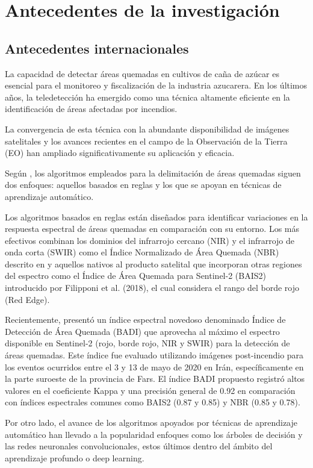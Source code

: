 \section{Antecedentes de la investigación}
\subsection{Antecedentes internacionales}
La capacidad de detectar áreas quemadas en cultivos de caña de azúcar es esencial para el monitoreo y 
fiscalización de la industria azucarera. En los últimos años, la teledetección ha emergido como una técnica altamente eficiente en la identificación 
de áreas afectadas por incendios. 

La convergencia de esta técnica con la abundante disponibilidad de imágenes 
satelitales y los avances recientes en el campo de la Observación 
de la Tierra (EO) han ampliado significativamente su aplicación y eficacia. 

Según \citet{knopp_deep_2020}, los algoritmos empleados para la delimitación de áreas quemadas siguen dos enfoques: 
aquellos basados en reglas y los que se apoyan en técnicas de aprendizaje automático.

Los algoritmos basados en reglas están diseñados para identificar variaciones en la respuesta espectral de áreas quemadas en comparación 
con su entorno. Los más efectivos combinan los dominios del infrarrojo cercano (NIR) y el infrarrojo de onda corta (SWIR) como el 
Índice Normalizado de Área Quemada (NBR) descrito en \citet{roy_remote_2006} y aquellos nativos al producto satelital que incorporan 
otras regiones del espectro como el Índice de Área Quemada para Sentinel-2 (BAIS2) introducido por Filipponi et al. (2018), el cual considera 
el rango del borde rojo (Red Edge).

Recientemente, \citet{farhadi_badi_2023} presentó un índice espectral novedoso denominado Índice de Detección de Área Quemada (BADI) que
aprovecha al máximo el espectro disponible en Sentinel-2 (rojo, borde rojo, NIR y SWIR) para la detección de áreas quemadas. Este índice fue evaluado
utilizando imágenes post-incendio para los eventos ocurridos entre el 3 y 13 de mayo de 2020 en Irán, específicamente en la parte suroeste de la provincia de Fars. El índice BADI 
propuesto registró altos valores en el coeficiente Kappa y una precisión 
general de 0.92 en comparación con índices espectrales comunes como BAIS2 (0.87 y 0.85) y NBR (0.85 y 0.78).

Por otro lado, el avance de los algoritmos apoyados por técnicas de aprendizaje automático han llevado a la popularidad enfoques como los árboles de decisión 
y las redes neuronales convolucionales, estos últimos dentro del ámbito del 
aprendizaje profundo o deep learning. 

